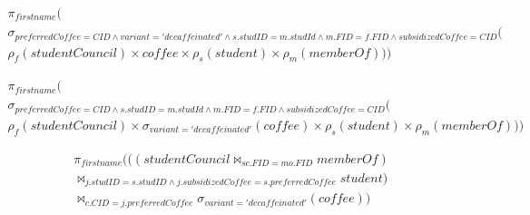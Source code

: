 \documentclass[12pt,a4paper]{letter}
\begin{document}
\begin{multline}
     \pi_{firstname}(\\
          \sigma_{preferredCoffee=CID \land variant = 'decaffeinated' \land s.studID = m.studId \land m.FID = f.FID \land subsidizedCoffee = CID}(\\
     \rho_f(studentCouncil)\times coffee \times \rho_s(student) \times \rho_m(memberOf)       
          )    
     )
\end{multline}

\begin{multline}
     \pi_{firstname}(\\
          \sigma_{preferredCoffee=CID \land s.studID = m.studId \land m.FID = f.FID \land subsidizedCoffee = CID}(\\
     \rho_f(studentCouncil)\times \sigma_{variant = 'decaffeinated'}(coffee) \times \rho_s(student) \times \rho_m(memberOf)       
          )    
     )
\end{multline}

\begin{multline}
     \pi_{firstname}(          
     ((studentCouncil \Join_{sc.FID = mo.FID}memberOf) \\ \Join_{j.studID = s.studID \land j.subsidizedCoffee = s.preferredCoffee} student) \\  \Join_{c.CID= j.preferredCoffee} \sigma_{variant = 'decaffeinated'}(coffee)         
     )
\end{multline}
\end{document}
